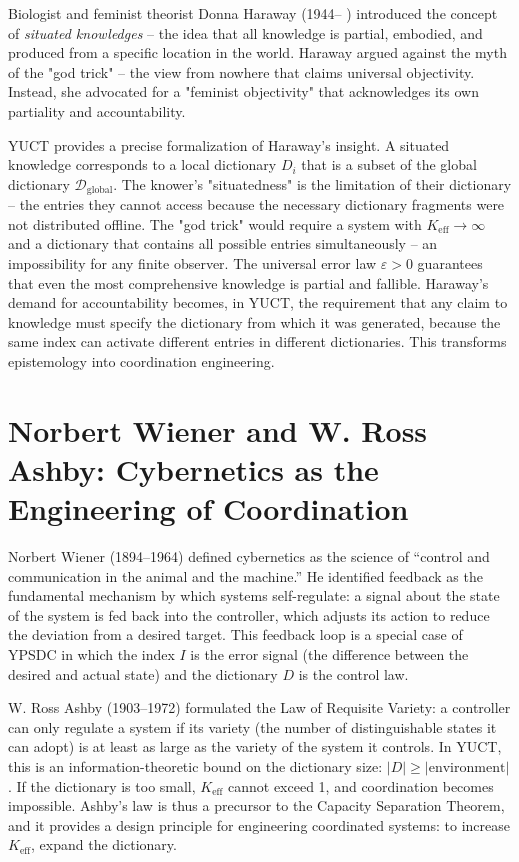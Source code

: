 \documentclass[12pt,a4paper]{article}
\begin{document}
	Biologist and feminist theorist Donna Haraway (1944-- ) introduced the concept of \emph{situated knowledges} -- the idea that all knowledge is partial, embodied, and produced from a specific location in the world. Haraway argued against the myth of the "god trick" -- the view from nowhere that claims universal objectivity. Instead, she advocated for a "feminist objectivity" that acknowledges its own partiality and accountability.
	
	YUCT provides a precise formalization of Haraway's insight. A situated knowledge corresponds to a local dictionary \(D_i\) that is a subset of the global dictionary \(\mathcal{D}_{\text{global}}\). The knower's "situatedness" is the limitation of their dictionary -- the entries they cannot access because the necessary dictionary fragments were not distributed offline. The "god trick" would require a system with \(K_{\mathrm{eff}} \to \infty\) and a dictionary that contains all possible entries simultaneously -- an impossibility for any finite observer. The universal error law \(\varepsilon > 0\) guarantees that even the most comprehensive knowledge is partial and fallible. Haraway's demand for accountability becomes, in YUCT, the requirement that any claim to knowledge must specify the dictionary from which it was generated, because the same index can activate different entries in different dictionaries. This transforms epistemology into coordination engineering.
	
	\section{Norbert Wiener and W. Ross Ashby: Cybernetics as the Engineering of Coordination}
	
	Norbert Wiener (1894–1964) defined cybernetics as the science of ``control and communication in the animal and the machine.'' He identified feedback as the fundamental mechanism by which systems self-regulate: a signal about the state of the system is fed back into the controller, which adjusts its action to reduce the deviation from a desired target. This feedback loop is a special case of YPSDC in which the index \(I\) is the error signal (the difference between the desired and actual state) and the dictionary \(D\) is the control law.
	
	W. Ross Ashby (1903–1972) formulated the Law of Requisite Variety: a controller can only regulate a system if its variety (the number of distinguishable states it can adopt) is at least as large as the variety of the system it controls. In YUCT, this is an information-theoretic bound on the dictionary size: \(|D| \ge |\text{environment}|\). If the dictionary is too small, \(K_{\mathrm{eff}}\) cannot exceed 1, and coordination becomes impossible. Ashby's law is thus a precursor to the Capacity Separation Theorem, and it provides a design principle for engineering coordinated systems: to increase \(K_{\mathrm{eff}}\), expand the dictionary.
	
\end{document}
